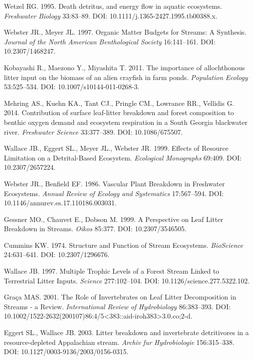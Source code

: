 \documentclass[12pt,letter]{article}
\begin{document}
\label{csl:8}Wetzel RG. 1995. {Death detritus, and energy flow in aquatic ecosystems}. \textit{Freshwater Biology} 33:83–89. DOI: 10.1111/j.1365-2427.1995.tb00388.x.

\label{csl:9}Webster JR., Meyer JL. 1997. {Organic Matter Budgets for Streams: A Synthesis}. \textit{Journal of the North American Benthological Society} 16:141–161. DOI: 10.2307/1468247.

\label{csl:10}Kobayashi R., Maezono Y., Miyashita T. 2011. {The importance of allochthonous litter input on the biomass of an alien crayfish in farm ponds}. \textit{Population Ecology} 53:525–534. DOI: 10.1007/s10144-011-0268-3.

\label{csl:11}Mehring AS., Kuehn KA., Tant CJ., Pringle CM., Lowrance RR., Vellidis G. 2014. {Contribution of surface leaf-litter breakdown and forest composition to benthic oxygen demand and ecosystem respiration in a South Georgia blackwater river}. \textit{Freshwater Science} 33:377–389. DOI: 10.1086/675507.

\label{csl:12}Wallace JB., Eggert SL., Meyer JL., Webster JR. 1999. {Effects of Resource Limitation on a Detrital-Based Ecosystem}. \textit{Ecological Monographs} 69:409. DOI: 10.2307/2657224.

\label{csl:13}Webster JR., Benfield EF. 1986. {Vascular Plant Breakdown in Freshwater Ecosystems}. \textit{Annual Review of Ecology and Systematics} 17:567–594. DOI: 10.1146/annurev.es.17.110186.003031.

\label{csl:14}Gessner MO., Chauvet E., Dobson M. 1999. {A Perspective on Leaf Litter Breakdown in Streams}. \textit{Oikos} 85:377. DOI: 10.2307/3546505.

\label{csl:15}Cummins KW. 1974. {Structure and Function of Stream Ecosystems}. \textit{{BioScience}} 24:631–641. DOI: 10.2307/1296676.

\label{csl:16}Wallace JB. 1997. {Multiple Trophic Levels of a Forest Stream Linked to Terrestrial Litter Inputs}. \textit{Science} 277:102–104. DOI: 10.1126/science.277.5322.102.

\label{csl:17}Gra{\c{c}}a MAS. 2001. {The Role of Invertebrates on Leaf Litter Decomposition in Streams - a Review}. \textit{International Review of Hydrobiology} 86:383–393. DOI: 10.1002/1522-2632(200107)86:4/5<383::aid-iroh383>3.0.co;2-d.

\label{csl:18}Eggert SL., Wallace JB. 2003. {Litter breakdown and invertebrate detritivores in a resource-depleted Appalachian stream}. \textit{Archiv fur Hydrobiologie} 156:315–338. DOI: 10.1127/0003-9136/2003/0156-0315.
\end{document}
